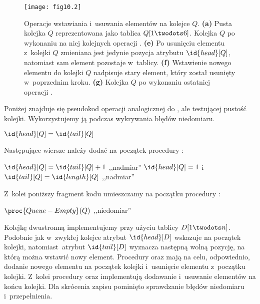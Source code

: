 \begin{figure}[ht]
	\begin{center}
		\texttt{[image: fig10.2]}
	\end{center}
	\caption{Operacje wstawiania i~usuwania elementów na kolejce $Q$. {\sffamily\bfseries(a)} Pusta kolejka $Q$ reprezentowana jako tablica $Q[1\twodots6]$. {\sffamily\bfseries{}} Kolejka $Q$ po wykonaniu na niej kolejnych operacji . {\sffamily\bfseries(e)} Po usunięciu elementu z~kolejki $Q$ zmieniana jest jedynie pozycja atrybutu $\id{head}[Q]$, natomiast sam element pozostaje w~tablicy. {\sffamily\bfseries(f)} Wstawienie nowego elementu do kolejki $Q$ nadpisuje stary element, który został usunięty w~poprzednim kroku. {\sffamily\bfseries(g)} Kolejka $Q$ po wykonaniu ostatniej operacji .} \label{fig:10.1-3}
\end{figure}

\exercise %
Poniżej znajduje się pseudokod operacji analogicznej do , ale testującej pustość kolejki. Wykorzystujemy ją podczas wykrywania błędów niedomiaru.

\begin{codebox}
\li	\If $\id{head}[Q]=\id{tail}[Q]$
\li		\Then \Return {}
\li		\Else \Return {}
\End
\end{codebox}

Następujące wiersze należy dodać na początek procedury :
\begin{codebox}
\li	\If $\id{head}[Q]=\id{tail}[Q]+1$
\li		\Then \Error ,,nadmiar''
		\End
\li	\If $\id{head}[Q]=1$ i~$\id{tail}[Q]=\id{length}[Q]$
\li		\Then \Error ,,nadmiar''
		\End
\end{codebox}
Z~kolei poniższy fragment kodu umieszczamy na początku procedury :
\begin{codebox}
\li	\If $\proc{Queue-Empty}(Q)$
\li		\Then \Error ,,niedomiar''
		\End
\end{codebox}

\exercise %
Kolejkę dwustronną implementujemy przy użyciu tablicy $D[1\twodots n]$. Podobnie jak w~zwykłej kolejce atrybut $\id{head}[D]$ wskazuje na początek kolejki, natomiast~atrybut $\id{tail}[D]$ wyznacza następną wolną pozycję, na którą można wstawić nowy element. Procedury  oraz  mają na celu, odpowiednio, dodanie nowego elementu na początek kolejki i~usunięcie elementu z~początku kolejki. Z~kolei procedury  oraz  implementują dodawanie i~usuwanie elementów na końcu kolejki. Dla skrócenia zapisu pominięto sprawdzanie błędów niedomiaru i~przepełnienia.

